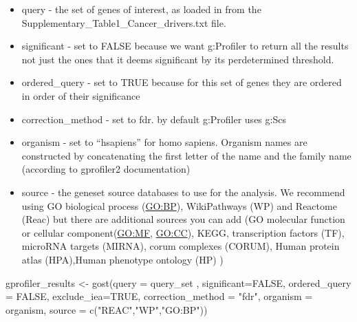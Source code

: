 \documentclass[
]{book}
\newenvironment{Shaded}{\begin{snugshade}}{\end{snugshade}}
\newcommand{\AttributeTok}[1]{\textcolor[rgb]{0.77,0.63,0.00}{#1}}
\newcommand{\CommentTok}[1]{\textcolor[rgb]{0.56,0.35,0.01}{\textit{#1}}}
\newcommand{\ConstantTok}[1]{\textcolor[rgb]{0.00,0.00,0.00}{#1}}
\newcommand{\DecValTok}[1]{\textcolor[rgb]{0.00,0.00,0.81}{#1}}
\newcommand{\FunctionTok}[1]{\textcolor[rgb]{0.00,0.00,0.00}{#1}}
\newcommand{\NormalTok}[1]{#1}
\newcommand{\OtherTok}[1]{\textcolor[rgb]{0.56,0.35,0.01}{#1}}
\newcommand{\SpecialCharTok}[1]{\textcolor[rgb]{0.00,0.00,0.00}{#1}}
\newcommand{\StringTok}[1]{\textcolor[rgb]{0.31,0.60,0.02}{#1}}
\providecommand{\tightlist}{%
  \setlength{\itemsep}{0pt}\setlength{\parskip}{0pt}}
\begin{document}
\begin{itemize}
\tightlist
\item
  query - the set of genes of interest, as loaded in from the Supplementary\_Table1\_Cancer\_drivers.txt file.
\item
  significant - set to FALSE because we want g:Profiler to return all the results not just the ones that it deems significant by its perdetermined threshold.
\item
  ordered\_query - set to TRUE because for this set of genes they are ordered in order of their significance
\item
  correction\_method - set to fdr. by default g:Profiler uses g:Scs
\item
  organism - set to ``hsapiens'' for homo sapiens. Organism names are constructed by concatenating the first letter of the name and the family name (according to gprofiler2 documentation)
\item
  source - the geneset source databases to use for the analysis. We recommend using GO biological process (\url{GO:BP}), WikiPathways (WP) and Reactome (Reac) but there are additional sources you can add (GO molecular function or cellular component(\url{GO:MF}, \url{GO:CC}), KEGG, transcription factors (TF), microRNA targets (MIRNA), corum complexes (CORUM), Human protein atlas (HPA),Human phenotype ontology (HP) )
\end{itemize}

\begin{Shaded}
\begin{Highlighting}[]
\NormalTok{gprofiler\_results }\OtherTok{\textless{}{-}} \FunctionTok{gost}\NormalTok{(}\AttributeTok{query =}\NormalTok{ query\_set ,}
                          \AttributeTok{significant=}\ConstantTok{FALSE}\NormalTok{,}
                          \AttributeTok{ordered\_query =} \ConstantTok{FALSE}\NormalTok{,}
                          \AttributeTok{exclude\_iea=}\ConstantTok{TRUE}\NormalTok{,}
                          \AttributeTok{correction\_method =} \StringTok{"fdr"}\NormalTok{,}
                          \AttributeTok{organism =}\NormalTok{ organism,}
                          \AttributeTok{source =} \FunctionTok{c}\NormalTok{(}\StringTok{"REAC"}\NormalTok{,}\StringTok{"WP"}\NormalTok{,}\StringTok{"GO:BP"}\NormalTok{))}
\end{Highlighting}
\end{Shaded}

\begin{Shaded}
\end{Shaded}
\end{document}
